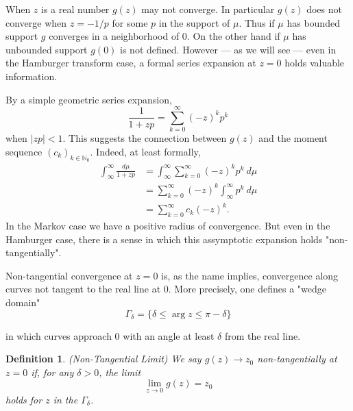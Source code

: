\documentclass{amsart}
\newtheorem{definition}[theorem]{Definition}
\theoremstyle{remark}
\numberwithin{equation}{section}
\newcommand{\NN}{\mathbb{N}}
\begin{document}
When $z$ is a real number $g(z)$ may not converge. In particular $g(z)$ does not converge when $z = -1/p$ for some $p$ in the support of $\mu$. Thus if $\mu$ has bounded support $g$ converges in a neighborhood of $0$. On the other hand if $\mu$ has unbounded support $g(0)$ is not defined. However — as we will see — even in the Hamburger transform case, a formal series expansion at $z = 0$ holds valuable information.

By a simple geometric series expansion,
\[
    \frac1{1 + zp} = \sum_{k = 0}^\infty (-z)^kp^k 
\]
when $|zp| < 1$. This suggests the connection between $g(z)$ and the moment sequence $(c_k)_{k \in \NN_0}$. Indeed, at least formally,
\begin{align*}
    \int_\infty^\infty\frac{d\mu}{1+zp}
    &= \int_\infty^\infty \sum_{k = 0}^\infty (-z)^kp^k ~d\mu \\
    &= \sum_{k = 0}^\infty (-z)^k \int_\infty^\infty p^k ~d\mu \\
    &= \sum_{k = 0}^\infty c_k(-z)^k.
\end{align*}
In the Markov case we have a positive radius of convergence. But even in the Hamburger case, there is a sense in which this assymptotic expansion holds "non-tangentially".

Non-tangential convergence at $z = 0$ is, as the name implies, convergence along curves not tangent to the real line at $0$. More precisely, one defines a "wedge domain"
\[
    \Gamma_\delta = \{\delta \leq \arg z \leq \pi - \delta\}
\]
\begin{figure}
\end{figure}
in which curves approach $0$ with an angle at least $\delta$ from the real line.

\begin{definition} (Non-Tangential Limit)
    We say $g(z) \rightarrow z_0$ non-tangentially at $z = 0$ if, for any $\delta > 0$, the limit 
    \[
        \lim_{z \rightarrow 0} g(z) = z_0
    \]
    holds for $z$ in the $\Gamma_\delta$.
\end{definition}
\end{document}

